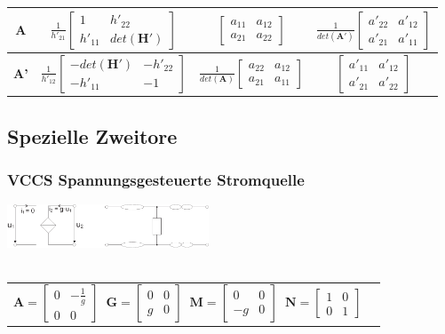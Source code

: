 \documentclass[a4paper,twocolumn,10pt]{article}
\begin{document}
{\begin{tabular}{@{}|@{}c@{}|@{}c@{}|@{}c@{}|@{}c@{}|}
\hline \textbf{A} & $\frac{1}{h'_{21}}\begin{bmatrix}1 & h'_{22}\\ h'_{11} & det(\textbf{H}')\end{bmatrix}$ & $\begin{bmatrix}a_{11} & a_{12}\\ a_{21} & a_{22}\end{bmatrix}$ & $\frac{1}{det(\textbf{A}')}\begin{bmatrix}a'_{22} & a'_{12}\\ a'_{21} & a'_{11}\end{bmatrix}$\\
\hline \textbf{A'} & $\frac{1}{h'_{12}}\begin{bmatrix}-det(\textbf{H}') & -h'_{22}\\ -h'_{11} & -1\end{bmatrix}$ & $\frac{1}{det(\textbf{A})}\begin{bmatrix}a_{22} & a_{12}\\ a_{21} & a_{11}\end{bmatrix}$ & $\begin{bmatrix}a'_{11} & a'_{12}\\ a'_{21} & a'_{22}\end{bmatrix}$\\
\hline 
\end{tabular}}

\subsection*{Spezielle Zweitore}
\subsubsection*{VCCS Spannungsgesteuerte Stromquelle}
\includegraphics[width=0.45\textwidth]{Grafiken/OP_USI}\\\\
\begin{tabular}{ll}
$\textbf{A}=\begin{bmatrix}0 & -\frac{1}{g}\\ 0 & 0\end{bmatrix}\;\;\textbf{G}=\begin{bmatrix}0 & 0\\ g & 0\end{bmatrix}\;\;\textbf{M}=\begin{bmatrix}0 & 0\\ -g & 0\end{bmatrix}\;\;\textbf{N}=\begin{bmatrix}1 & 0\\ 0 & 1\end{bmatrix}$
\end{tabular}
\end{document}
